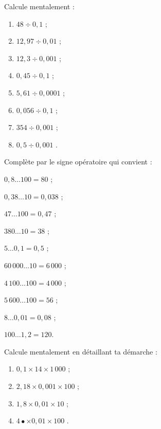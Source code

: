 \begin{exercice}
Calcule mentalement :
\begin{enumerate} 
 \item $48 \div 0,1$ \dotfill ; 
 
 \item $12,97 \div 0,01$ \dotfill ; 
 \item $12,3 \div 0,001$ \dotfill ; 
 
 \item $0,45 \div 0,1$ \dotfill ; 
        
 \item $5,61 \div 0,0001$ \dotfill ; 
        
 \item $0,056 \div 0,1$ \dotfill ; 
 
 \item $354 \div 0,001$ \dotfill ; 
 
 \item $0,5 \div 0,001$ \dotfill. 
 \end{enumerate}
\end{exercice}
\begin{exercice}
Complète par le signe opératoire qui convient :
\begin{colenumerate}{2}
 \item $0,8 \ldots 100 = 80$ ;
 \item $0,38 \ldots 10 = 0,038$ ;
 \item $47 \ldots 100 = 0,47$ ;
 \item $380 \ldots 10 = 38$ ;
 \item $5 \ldots 0,1 = 0,5$ ;
 \item $60\,000 \ldots 10 = 6\,000$ ;
 \item $4\,100 \ldots 100 = 4\,000$ ;
 \item $5\,600 \ldots 100 = 56$ ;
 \item $8 \ldots 0,01 = 0,08$ ;
 \item \hspace{0.25em}$100 \ldots 1,2 = 120$.
 \end{colenumerate} 
\end{exercice}
\begin{exercice}
Calcule mentalement en détaillant ta démarche :
\begin{enumerate} 
 \item $0,1 \times 14 \times 1\,000$ \dotfill ; 
 
 \item $2,18 \times 0,001 \times 100$ \dotfill ; 
 \item $1,8 \times 0,01 \times 10$ \dotfill ; 
 \item $4 •\times 0,01 \times 100$ \dotfill. 
 \end{enumerate} 
\end{exercice}

